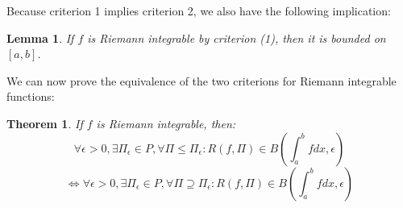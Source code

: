 \documentclass[10pt,letterpaper]{article} %
\newtheorem{thm}{Theorem}[section]
\newtheorem{lem}{Lemma}[section]
\begin{document}
Because criterion 1 implies criterion 2, we also have the following implication:
\begin{lem}
If $f$ is Riemann integrable by criterion (1), then it is bounded on $[a, b]$.
\end{lem}

\medskip
We can now prove the equivalence of the two criterions for Riemann integrable functions:
\begin{thm}
If $f$ is Riemann integrable, then:
\begin{equation*}
\forall \epsilon > 0, \exists \Pi_\epsilon \in P, \forall \Pi \leq \Pi_\epsilon: R(f, \Pi) \in B\left(\int_{a}^{b}fdx, \epsilon\right)
\end{equation*}
\begin{equation*}
\iff \forall \epsilon > 0, \exists \Pi_\epsilon \in P, \forall \Pi \supseteq \Pi_\epsilon: R(f, \Pi) \in B\left(\int_{a}^{b}fdx, \epsilon\right)
\end{equation*}
\end{thm}
\end{document}
